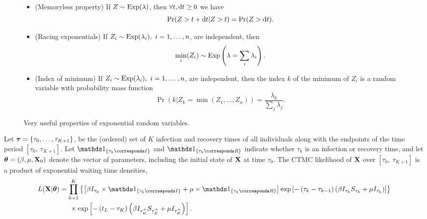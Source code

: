 \begin{figure}[htbp]
	\caption{Very useful properties of exponential random variables.}
	\label{fig:exp_props}
	\begin{itemize}
		\item (Memoryless property) If $ Z\sim\mathrm{Exp}(\lambda)$, then $ \forall t,\mathrm{d} t\geq0 $  we have \begin{equation}\label{eqn:memoryless_prop}
		 \Pr(Z > t+\mathrm{d} t | Z>t) = \Pr(Z>\mathrm{d} t).
		\end{equation}
		\item (Racing exponentials) If $ Z_i\sim\mathrm{Exp}(\lambda_i),\ i=1,\dots,n $, are independent, then \begin{equation}\label{eqn:racing_exponentials}
		\underset{i}{\mathrm{min}}(Z_i) \sim \mathrm{Exp}\left (\lambda = \sum_i\lambda_i\right ).
		\end{equation}
		\item (Index of minimum) If $ Z_i\sim\mathrm{Exp}(\lambda_i),\ i=1,\dots,n $, are independent, then the index $ k $ of the minimum of $ Z_i $ is a random variable with probability mass function \begin{equation}\label{eqn:ind_of_min}
		\Pr(k|Z_k = \min(Z_1,\dots,Z_n)) = \frac{\lambda_k}{\sum_j\lambda_j}.
		\end{equation} 
	\end{itemize}
\end{figure}

Let $ \boldsymbol{\tau} = \lbrace\tau_0,\dots,\tau_{K+1}\rbrace $, be the (ordered) set of $ K $ infection and recovery times of all individuals along with the endpoints of the time period $ [\tau_0,\ \tau_{K+1}] $. Let $ \ind{\tau_k \corresponds I} $ and $ \ind{\tau_k \corresponds R} $ indicate whether $ \tau_k $ is an infection or recovery time, and let $ \boldsymbol{\theta} = (\beta, \mu, \mathbf{X}_0) $ denote the vector of parameters, including the initial state of $ \mathbf{X} $ at time $ \tau_0 $. The CTMC likelihood of $ \mathbf{X} $ over $ [\tau_0,\ \tau_{K+1}] $ is a product of exponential waiting time densities,
\begin{align} 
\label{eqn:sir_subj_likelihood}
L(\bX| \btheta) &= \prod_{k = 1}^{K}\left \lbrace \left [\beta I_{\tau_k}\times\ind{\tau_k \corresponds I} + \mu\times\ind{\tau_k \corresponds R}\right ] \exp{\left [-\left (\tau_k - \tau_{k-1}\right )\left (\beta I_{\tau_k} S_{\tau_k} + \mu I_{\tau_k}\right )\right ]}\right \rbrace \nonumber \\
& \hspace{0.2in} \times \exp \left [-\left (t_L - \tau_K\right )\left (\beta I_{\tau_K^+}S_{\tau_K^+} + \mu I_{\tau_K^+}\right )\right ]. 
\end{align}

